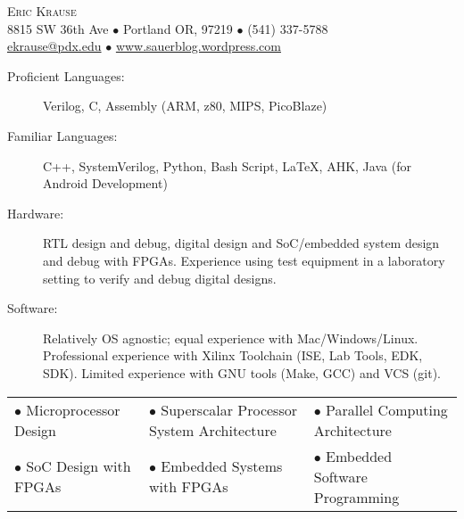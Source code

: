 \documentclass{article}
\begin{document}
\thispagestyle{firststyle} %
\small

\vspace*{-.5in} %

\begin{center}
	{\LARGE \scshape {Eric Krause}}	\\
	8815 SW 36th Ave $\bullet$ Portland OR, 97219  $\bullet$ (541) 337-5788\\
	\url{ekrause@pdx.edu}  $\bullet$  \url{www.sauerblog.wordpress.com}\\
\end{center}

\vspace{-12pt}


	\vspace{-15pt}
	\begin{description}
		\item[Proficient Languages:] Verilog, C, Assembly (ARM, z80, MIPS, PicoBlaze)
		\item[Familiar Languages:] C++, SystemVerilog, Python, Bash Script, \LaTeX, AHK, Java (for Android Development)
		\item[Hardware:] RTL design and debug, digital design and SoC/embedded system design and debug with FPGAs. Experience using test equipment in a laboratory setting to verify and debug digital designs.
		\item[Software:] Relatively OS agnostic; equal experience with Mac/Windows/Linux.  Professional experience with Xilinx Toolchain (ISE, Lab Tools, EDK, SDK).  Limited experience with GNU tools (Make, GCC) and VCS (git).
	\end{description}
	\vspace{-4pt}

	\begin{table}[h!]
		\small
		\vspace{-18pt}
	\begin{tabular}{lll}
	$\bullet$ Microprocessor Design & $\bullet$ Superscalar Processor System Architecture & $\bullet$ Parallel Computing Architecture\\
	$\bullet$ SoC Design with FPGAs & $\bullet$ Embedded Systems with FPGAs & $\bullet$ Embedded Software Programming\\
	\end{tabular}
	\vspace{-18pt}
\end{table}	
\end{document}
